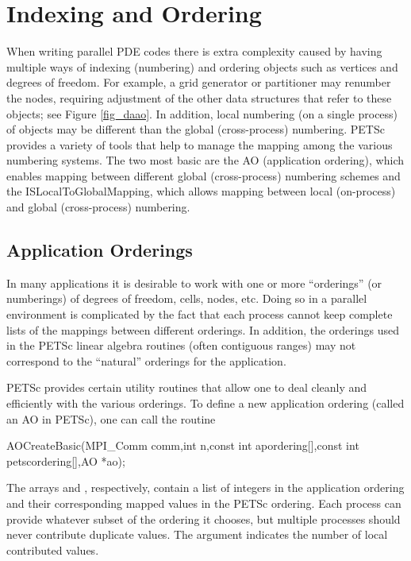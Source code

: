 \section{Indexing and Ordering}
\label{sec_indexingandordering}

  When writing parallel PDE codes there is extra complexity caused by
having multiple ways of indexing (numbering) and ordering objects such
as vertices and degrees of freedom. For example, a grid generator
or partitioner may renumber the nodes, requiring adjustment of the
other data structures that refer to these objects; see Figure
\ref{fig_daao}.  In addition, local numbering (on a single process)
of objects may be different than the global (cross-process)
numbering. PETSc provides a variety of tools that help to manage the
mapping among the various numbering systems. The two most basic are
the AO (application ordering), which enables mapping between
different global (cross-process) numbering schemes and the ISLocalToGlobalMapping, which allows mapping between local
(on-process) and global (cross-process) numbering.

\subsection{Application Orderings}
\label{sec_ao}

In many applications it is desirable to work with one or more
``orderings'' (or numberings) of degrees of freedom, cells, nodes,
etc.   Doing so in a parallel environment is
complicated by the fact that each process cannot keep complete lists
of the mappings between different orderings. In addition, the
orderings used in the PETSc linear algebra routines (often contiguous
ranges) may not correspond to the ``natural'' orderings for the application.

PETSc provides certain utility routines that allow one to deal cleanly
and efficiently with the various orderings. To define a new application ordering
(called an AO in PETSc), one can call the routine
\begin{tabbing}
  AOCreateBasic(MPI\_Comm comm,int n,const int apordering[],const int petscordering[],AO *ao);
\end{tabbing}
The
arrays  and , respectively, contain a list of integers
in the application ordering and their corresponding mapped values in the PETSc
ordering. Each process can provide whatever subset of the ordering it
chooses, but multiple processes should never contribute duplicate values.
The argument  indicates the number of local contributed values.

